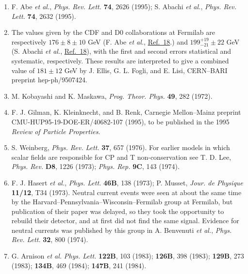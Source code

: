 \begin{enumerate}
\item {}\label{ch21-ref-18}
F. Abe \emph{et al.}, \emph{Phys. Rev. Lett.} \textbf{74}, 2626 (1995);
S. Abachi \emph{et al.}, \emph{Phys. Rev. Lett.} \textbf{74}, 2632
(1995).

\item {}\label{ch21-ref-19}
The values given by the CDF and D0 collaborations at Fermilab are
respectively $176\pm8\pm10$ GeV (F. Abe \emph{et al.},
\hyperref[ch21-ref-18]{Ref.~18}.) and
$199^{+19}_{-21}\pm22$ GeV (S. Abachi \emph{et al.},
\hyperref[ch21-ref-18]{Ref.~18}), with the first and second errors
statistical and systematic, respectively. These results are interpreted to
give a combined value of $181\pm12$ GeV by J. Ellis, G. L. Fogli, and
E. Lisi, CERN--BARI preprint hep-ph/9507424.

\item {}\label{ch21-ref-20}
M. Kobayashi and K. Maskawa, \emph{Prog. Theor. Phys.} \textbf{49}, 282
(1972).

\item[20a.] \label{ch21-ref-20a}
F. J. Gilman, K. Kleinknecht, and B. Renk, Carnegie Mellon--Mainz
preprint CMU-HUP95-19-DOE-ER/40682-107 (1995), to be published in the
1995 \emph{Review of Particle Properties}.

\item[20b.] \label{ch21-ref-20b}
S. Weinberg, \emph{Phys. Rev. Lett.} \textbf{37}, 657 (1976). For earlier
models in which scalar fields are responsible for CP and T
non-conservation see T. D. Lee, \emph{Phys. Rev.} \textbf{D8}, 1226
(1973); \emph{Phys. Rep.} \textbf{9C}, 143 (1974).

\item {}\label{ch21-ref-21}
F. J. Hasert \emph{et al.}, \emph{Phys. Lett.} \textbf{46B}, 138 (1973);
P. Musset, \emph{Jour. de Physique} \textbf{11/12}, T34 (1973). Neutral
current events were seen at about the same time by the
Harvard--Pennsylvania--Wisconsin--Fermilab group at Fermilab, but
publication of their paper was delayed, so they took the opportunity to
rebuild their detector, and at first did not find the same signal. Evidence
for neutral currents was published by this group in A. Benvenuti
\emph{et al.}, \emph{Phys. Rev. Lett.} \textbf{32}, 800 (1974).

\item {}\label{ch21-ref-22}
G. Arnison \emph{et al.} \emph{Phys. Lett.} \textbf{122B}, 103 (1983);
\textbf{126B}, 398 (1983); \textbf{129B}, 273 (1983); \textbf{134B}, 469
(1984); \textbf{147B}, 241 (1984).


\end{enumerate}
